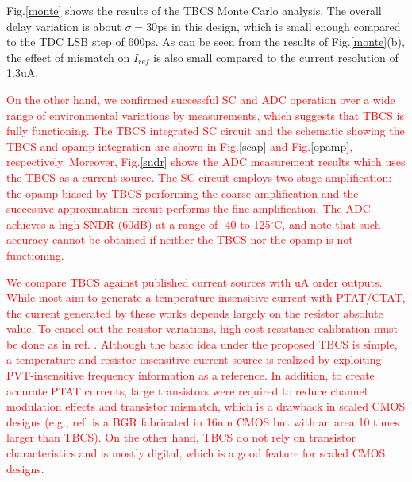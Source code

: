 \documentclass[paper]{ieice}
\begin{document}
Fig.\ref{monte} shows the results of the TBCS Monte Carlo analysis. The overall delay variation is about $\sigma= 30$ps in this design, which is small enough compared to the TDC LSB step of 600ps. As can be seen from the results of Fig.\ref{monte}(b), the effect of mismatch on $I_{ref}$ is also small compared to the current resolution of 1.3uA. %

\textcolor{red}{
On the other hand, we confirmed successful SC and ADC operation over a wide range of environmental variations by measurements, which suggests that TBCS is fully functioning. %
The TBCS integrated SC circuit and the schematic showing the TBCS and opamp integration are shown in Fig.\ref{scap} and Fig.\ref{opamp}, respectively. Moreover, Fig.\ref{sndr} shows the ADC measurement results which uses the TBCS as a current source. The SC circuit employs two-stage amplification: the opamp biased by TBCS performing the coarse amplification and the successive approximation circuit performs the fine amplification. The ADC achieves a high SNDR (60dB) at a range of -40 to 125$^\circ$C, and note that such accuracy cannot be obtained if neither the TBCS nor the opamp is not functioning. }

\textcolor{red}{We compare TBCS against published current sources with uA order outputs. While most aim to generate a temperature insensitive current with PTAT/CTAT, the current generated by these works depends largely on the resistor absolute value. To cancel out the resistor variations, high-cost resistance calibration must be done as in ref. \cite{osipov2016temperature}. Although the basic idea under the proposed TBCS is simple, a temperature and resistor insensitive current source is realized by exploiting PVT-insensitive frequency information as a reference. In addition, to create accurate PTAT currents, large transistors were required to reduce channel modulation effects and transistor mismatch, which is a drawback in scaled CMOS designs (e.g., ref. \cite{wadhwa2017high} is a BGR fabricated in 16nm CMOS but with an area 10 times larger than TBCS). On the other hand, TBCS do not rely on transistor characteristics and is mostly digital, which is a good feature for scaled CMOS designs.}
\end{document}
